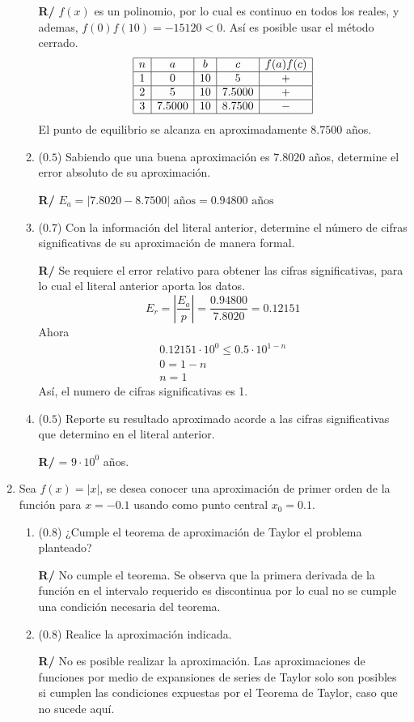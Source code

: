 \documentclass[12pt]{article}
\begin{document}
\begin{enumerate}[leftmargin=*,widest=9]
\begin{enumerate}[label=\alph*]
\textbf{R/} \(f(x)\) es un polinomio, por lo cual es continuo en todos los reales, y ademas, \(f(0)f(10)= -15120 < 0\). Así es posible usar el método cerrado.
\[
\begin{array}{|c|c|c|c|c|}
  \hline
  n & a & b & c & f(a)f(c)\\
  \hline
  1 & 0 & 10 & 5 & + \\
  \hline
  2 & 5 & 10 & 7.5000 & + \\
  \hline
  3 & 7.5000 & 10 & 8.7500 & - \\
  \hline
 \end{array}
\]
El punto de equilibrio se alcanza en aproximadamente \(8.7500\) años.
    \item (\(0.5\)) Sabiendo que una buena aproximación es \(7.8020\) años, determine el error absoluto de su aproximación.

\textbf{R/} \(E_a = |7.8020 - 8.7500| \text{ años} = 0.94800 \text{ años}\)
    \item (\(0.7\)) Con la información del literal anterior, determine el número de cifras significativas de su aproximación de manera formal.

\textbf{R/} Se requiere el error relativo para obtener las cifras significativas, para lo cual el literal anterior aporta los datos.
\[E_r = \left| \frac{E_a}{p}\right| = \frac{0.94800}{7.8020} = 0.12151\]
Ahora
\begin{eqnarray*}
0.12151 \cdot 10^0 \leq 0.5 \cdot 10^{1-n} \\ 0 = 1-n \\ n = 1
\end{eqnarray*}
Así, el numero de cifras significativas es 1.
\item (\(0.5\)) Reporte su resultado aproximado acorde a las cifras significativas que determino en el literal anterior.

\textbf{R/} = \(9 \cdot 10^0\) años.
\end{enumerate}
   \item Sea \(f(x) = \left\vert x \right\vert\), se desea conocer una aproximación de primer orden de la función para \(x=-0.1\) usando como punto central \(x_0=0.1\).
   \begin{enumerate}[label=\alph*]
    \item (\(0.8\)) ¿Cumple el teorema de aproximación de Taylor el problema planteado?

\textbf{R/} No cumple el teorema. Se observa que la primera derivada de la función en el intervalo requerido es discontinua por lo cual no se cumple una condición necesaria del teorema.
\item (\(0.8\)) Realice la aproximación indicada.

\textbf{R/} No es posible realizar la aproximación. Las aproximaciones de funciones por medio de expansiones de series de Taylor solo son posibles si cumplen las condiciones expuestas por el Teorema de Taylor, caso que no sucede aquí.
  \end{enumerate}
\end{enumerate}
\end{document}
